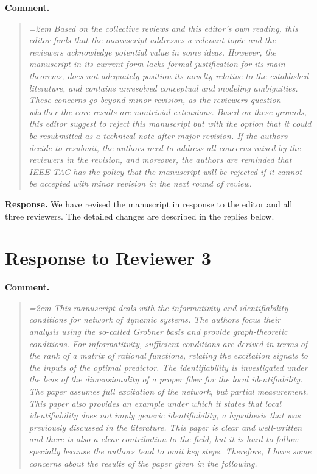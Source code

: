 \documentclass[11pt]{article}
\begin{document}
\textbf{Comment.}
\begin{quote}\itshape\emergencystretch=2em
Based on the collective reviews and this editor\textquoteright{}s own reading, this editor finds that the manuscript addresses a relevant topic and the reviewers acknowledge potential value in some ideas. However, the manuscript in its current form lacks formal justification for its main theorems, does not adequately position its novelty relative to the established literature, and contains unresolved conceptual and modeling ambiguities. These concerns go beyond minor revision, as the reviewers question whether the core results are nontrivial extensions. Based on these grounds, this editor suggest to reject this manuscript but with the option that it could be resubmitted as a technical note after major revision. If the authors decide to resubmit, the authors need to address all concerns raised by the reviewers in the revision, and moreover, the authors are reminded that IEEE TAC has the policy that the manuscript will be rejected if it cannot be accepted with minor revision in the next round of review.
\end{quote}

\textbf{Response.} We have revised the manuscript in response to the editor and all three reviewers. The detailed changes are described in the replies below.

\section*{Response to Reviewer 3}

\textbf{Comment.}
\begin{quote}\itshape\emergencystretch=2em
This manuscript deals with the informativity and identifiability conditions for network of dynamic systems. The authors focus their analysis using the so-called Grobner basis and provide graph-theoretic conditions. For informatitvity, sufficient conditions are derived in terms of the rank of a matrix of rational functions, relating the excitation signals to the inputs of the optimal predictor. The identifiability is investigated under the lens of the dimensionality of a proper fiber for the local identifiability. The paper assumes full excitation of the network, but partial measurement. This paper also provides an example under which it states that local identifiability does not imply generic identifiability, a hypothesis that was previously discussed in the literature. This paper is clear and well-written and there is also a clear contribution to the field, but it is hard to follow specially because the authors tend to omit key steps. Therefore, I have some concerns about the results of the paper given in the following.
\end{quote}
\end{document}
